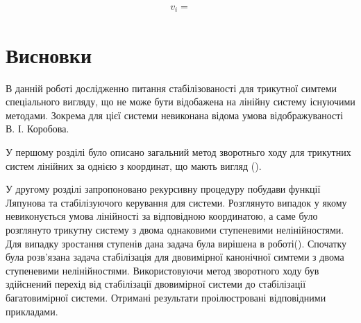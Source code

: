 \documentclass{article}
\begin{document}
\begin{eqnarray}
    v_{i}=
\end{eqnarray}


\pagebreak
\section{Висновки}
В данній роботі дослідженно питання стабілізованості для  трикутної симтеми спеціального 
вигляду, що не може бути відобажена на лінійну систему існуючими методами. Зокрема 
для цієї системи невиконана відома умова  відображуваності В. І. Коробова.

У першому розділі було описано загальний метод зворотньго 
ходу для трикутних систем лінійних за однією з координат,
що мають вигляд ().

У другому розділі запропоновано рекурсивну процедуру побудави функції Ляпунова та стабілізуючого керування 
для системи. 
Розглянуто випадок у якому невиконується умова лінійності за відповідною
координатою, а саме було розглянуто трикутну систему з двома однаковими ступеневими нелінійностями. 
Для випадку зростання ступенів дана задача була вирішена в роботі().  
Спочатку була розв'язана задача стабілізація для двовимірної канонічної симтеми 
з двома ступеневими нелінійностями. Використовуючи метод зворотного ходу був здійснений перехід від стабілізації двовимірної системи
до стабілізації багатовимірної системи. Отримані результати проілюстровані відповідними прикладами.












\end{document}
